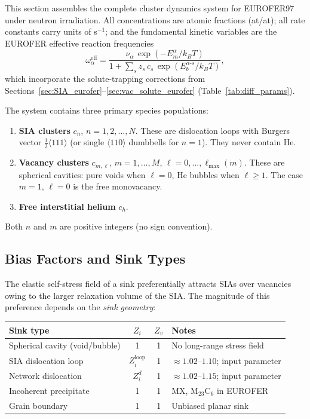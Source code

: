 This section assembles the complete cluster dynamics system for EUROFER97
under neutron irradiation. All concentrations are atomic fractions (at/at);
all rate constants carry units of s$^{-1}$; and the fundamental kinetic
variables are the EUROFER effective reaction frequencies
\begin{equation}\label{eq:omega_eff}
    \omega_\alpha^{\mathrm{eff}}
    = \frac{\nu_\alpha\,\exp(-E_m^\alpha/k_BT)}
           {1 + \sum_s z_s\,c_s\,\exp(E_b^{\alpha\text{-}s}/k_BT)},
\end{equation}
which incorporate the solute-trapping corrections from
Sections~\ref{sec:SIA_eurofer}--\ref{sec:vac_solute_eurofer}
(Table~\ref{tab:diff_params}).

The system contains three primary species populations:
\begin{enumerate}
    \item \textbf{SIA clusters} $c_{n}$, $n = 1,2,\ldots,N$. These are
    dislocation loops with Burgers vector $\tfrac{1}{2}\langle111\rangle$
    (or single $\langle110\rangle$ dumbbells for $n=1$). They never
    contain He.
    \item \textbf{Vacancy clusters} $c_{m,\ell}$,
    $m = 1,\ldots,M$, $\ell = 0,\ldots,\ell_{\max}(m)$.  These are
    spherical cavities: pure voids when $\ell = 0$, He bubbles when
    $\ell \geq 1$.  The case $m=1$, $\ell=0$ is the free monovacancy.
    \item \textbf{Free interstitial helium} $c_h$.
\end{enumerate}
Both $n$ and $m$ are positive integers (no sign convention).


\subsection{Bias Factors and Sink Types}
\label{sec:bias}

The elastic self-stress field of a sink preferentially attracts SIAs
over vacancies owing to the larger relaxation volume of the SIA.  The
magnitude of this preference depends on the \emph{sink geometry}:

\begin{center}
\renewcommand{\arraystretch}{1.15}
\begin{tabular}{@{}lccl@{}}
\toprule
\textbf{Sink type} & $Z_i$ & $Z_v$ & \textbf{Notes} \\
\midrule
Spherical cavity (void/bubble) & 1 & 1
  & No long-range stress field \\
SIA dislocation loop & $Z_i^{\mathrm{loop}}$ & 1
  & $\approx 1.02$--$1.10$; input parameter \\
Network dislocation & $Z_i^d$ & 1
  & $\approx 1.02$--$1.15$; input parameter \\
Incoherent precipitate & 1 & 1
  & MX, M$_{23}$C$_6$ in EUROFER \\
Grain boundary & 1 & 1
  & Unbiased planar sink \\
\bottomrule
\end{tabular}
\end{center}

